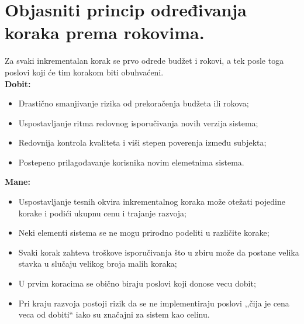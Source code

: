 \documentclass[a4paper]{article}
\begin{document}
\section{Objasniti princip određivanja koraka prema rokovima.}
  Za svaki inkrementalan korak se prvo odrede budžet i rokovi, a tek posle toga poslovi
  koji će tim korakom biti obuhvaćeni.\\
  \textbf{Dobit:}
  \begin{itemize}
    \item Drastično smanjivanje rizika od prekoračenja budžeta ili rokova;
    \item Uspostavljanje ritma redovnog isporučivanja novih verzija sistema;
    \item Redovnija kontrola kvaliteta i viši stepen poverenja između subjekta;
    \item Postepeno prilagođavanje korisnika novim elemetnima sistema.
  \end{itemize}
  \textbf{Mane:}
  \begin{itemize}
    \item Uspostavljanje tesnih okvira inkrementalnog koraka može otežati pojedine korake 
          i podići ukupnu cenu i trajanje razvoja;
    \item Neki elementi sistema se ne mogu prirodno podeliti u različite korake;
    \item Svaki korak zahteva troškove isporučivanja što u zbiru može da postane velika stavka u 
          slučaju velikog broja malih koraka;
    \item U prvim koracima se obično biraju poslovi koji donose vecu dobit;
    \item Pri kraju razvoja postoji rizik da se ne implementiraju poslovi ,,čija je cena 
          veca od dobiti`` iako su značajni za sistem kao celinu.
  \end{itemize}
\end{document}
